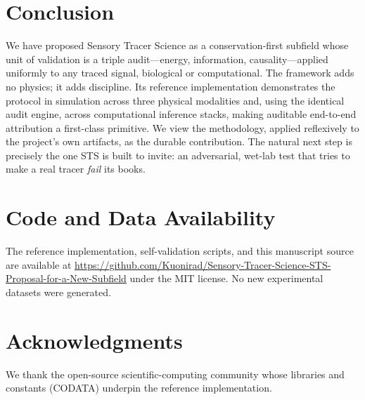 \documentclass[11pt,a4paper]{article}
\begin{document}
\section{Conclusion}
\label{sec:conclusion}

We have proposed Sensory Tracer Science as a conservation-first subfield whose
unit of validation is a triple audit---energy, information, causality---applied
uniformly to any traced signal, biological or computational. The framework adds no
physics; it adds discipline. Its reference implementation demonstrates the
protocol in simulation across three physical modalities and, using the identical
audit engine, across computational inference stacks, making auditable end-to-end
attribution a first-class primitive. We view the methodology, applied reflexively
to the project's own artifacts, as the durable contribution. The natural next step
is precisely the one STS is built to invite: an adversarial, wet-lab test that
tries to make a real tracer \emph{fail} its books.

\section*{Code and Data Availability}
The reference implementation, self-validation scripts, and this manuscript source
are available at
\url{https://github.com/Kuonirad/Sensory-Tracer-Science-STS-Proposal-for-a-New-Subfield}
under the MIT license. No new experimental datasets were generated.

\section*{Acknowledgments}
We thank the open-source scientific-computing community whose libraries and
constants (CODATA) underpin the reference implementation.



\end{document}
